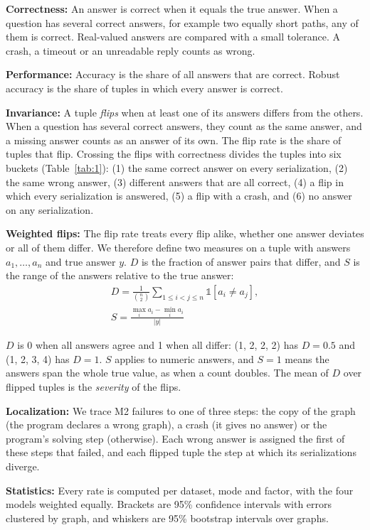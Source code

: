 \documentclass[11pt]{article}
\begin{document}
\textbf{Correctness:} An answer is correct when it equals the true answer. When a question has several correct answers, for example two equally short paths, any of them is correct. Real-valued answers are compared with a small tolerance. A crash, a timeout or an unreadable reply counts as wrong.

\textbf{Performance:} Accuracy is the share of all answers that are correct. Robust accuracy is the share of tuples in which every answer is correct.

\textbf{Invariance:} A tuple \emph{flips} when at least one of its answers differs from the others. When a question has several correct answers, they count as the same answer, and a missing answer counts as an answer of its own. The flip rate is the share of tuples that flip. Crossing the flips with correctness divides the tuples into six buckets (Table~\ref{tab:1}): (1) the same correct answer on every serialization, (2) the same wrong answer, (3) different answers that are all correct, (4) a flip in which every serialization is answered, (5) a flip with a crash, and (6) no answer on any serialization.

\textbf{Weighted flips:} The flip rate treats every flip alike, whether one answer deviates or all of them differ. We therefore define two measures on a tuple with answers $a_1, \ldots, a_n$ and true answer $y$. $D$ is the fraction of answer pairs that differ, and $S$ is the range of the answers relative to the true answer:
\begin{gather*}
D = \frac{1}{\binom{n}{2}} \sum_{1 \le i < j \le n} \mathds{1}\left[a_i \neq a_j\right], \\
S = \frac{\max_{i} a_i - \min_{i} a_i}{|y|}
\end{gather*}

$D$ is 0 when all answers agree and 1 when all differ: (1, 2, 2, 2) has $D = 0.5$ and (1, 2, 3, 4) has $D = 1$. $S$ applies to numeric answers, and $S = 1$ means the answers span the whole true value, as when a count doubles. The mean of $D$ over flipped tuples is the \emph{severity} of the flips.

\textbf{Localization:} We trace M2 failures to one of three steps: the copy of the graph (the program declares a wrong graph), a crash (it gives no answer) or the program's solving step (otherwise). Each wrong answer is assigned the first of these steps that failed, and each flipped tuple the step at which its serializations diverge.

\textbf{Statistics:} Every rate is computed per dataset, mode and factor, with the four models weighted equally. Brackets are 95\% confidence intervals with errors clustered by graph, and whiskers are 95\% bootstrap intervals over graphs.
\end{document}
